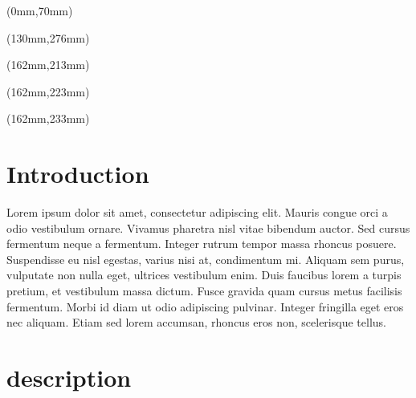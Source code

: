 \documentclass[11pt,a4paper,english]{report}
\newcommand{\CorpDocTitle}{}
\newcommand{\CorpDocReviewDate}{}
\newcommand{\CorpDocAuthor}{}
\newcommand{\CorpChef}{}
\newcommand{\CorpDocType}{}
\newcommand{\CorpDocProject}{}
\def\wl{\par \vspace{\baselineskip}}
\begin{document}
\textblockorigin{0cm}{0cm} %
\begin{textblock*}{210mm}(0mm,70mm)
\centering
{ \bfseries\Huge
\CorpDocProject
\wl
\vspace{-1.2ex}
\CorpDocType
\wl
\vspace{-1.2ex}
 \CorpDocTitle
   }
\end{textblock*}

\begin{textblock*}{80mm}(130mm,276mm)  %
\huge\bfseries
\CorpDocTitle
\end{textblock*}

\begin{textblock*}{50mm}(162mm,213mm)  %
\huge\Large
\CorpDocReviewDate
\end{textblock*}

\begin{textblock*}{50mm}(162mm,223mm)  %
\huge\Large
\CorpDocAuthor
\end{textblock*}



\begin{textblock*}{50mm}(162mm,233mm)  %
\huge\Large
\CorpChef
\end{textblock*}





\pagestyle{fancy}

\tableofcontents
\pagestyle{fancy}
\chapter{Introduction}


\par Lorem ipsum dolor sit amet, consectetur adipiscing elit. Mauris congue orci a odio vestibulum ornare. Vivamus pharetra nisl vitae bibendum auctor. Sed cursus fermentum neque a fermentum. Integer rutrum tempor massa rhoncus posuere. Suspendisse eu nisl egestas, varius nisi at, condimentum mi. Aliquam sem purus, vulputate non nulla eget, ultrices vestibulum enim. Duis faucibus lorem a turpis pretium, et vestibulum massa dictum. Fusce gravida quam cursus metus facilisis fermentum. Morbi id diam ut odio adipiscing pulvinar. Integer fringilla eget eros nec aliquam. Etiam sed lorem accumsan, rhoncus eros non, scelerisque tellus.

\chapter{description}
\end{document}
